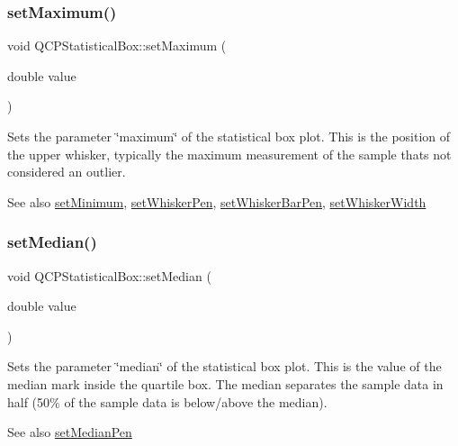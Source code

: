 \subsubsection{\texorpdfstring{set\+Maximum()}{setMaximum()}}
{\footnotesize\ttfamily void Q\+C\+P\+Statistical\+Box\+::set\+Maximum (\begin{DoxyParamCaption}\item[{double}]{value }\end{DoxyParamCaption})}

Sets the parameter \char`\"{}maximum\char`\"{} of the statistical box plot. This is the position of the upper whisker, typically the maximum measurement of the sample that\textquotesingle{}s not considered an outlier.

\begin{DoxySeeAlso}{See also}
\mbox{\hyperlink{class_q_c_p_statistical_box_a84ff7cc61ba44890f0c3e0c99c19941e}{set\+Minimum}}, \mbox{\hyperlink{class_q_c_p_statistical_box_a4a5034cb3b9b040444df05ab1684620b}{set\+Whisker\+Pen}}, \mbox{\hyperlink{class_q_c_p_statistical_box_aa8d3e503897788e1abf68dc74b5f147f}{set\+Whisker\+Bar\+Pen}}, \mbox{\hyperlink{class_q_c_p_statistical_box_adf378812446bd66f34d1f7f293d991cd}{set\+Whisker\+Width}} 
\end{DoxySeeAlso}
\mbox{\label{class_q_c_p_statistical_box_a65970e77a897da4ecb4b15300868aad3}} 
\subsubsection{\texorpdfstring{set\+Median()}{setMedian()}}
{\footnotesize\ttfamily void Q\+C\+P\+Statistical\+Box\+::set\+Median (\begin{DoxyParamCaption}\item[{double}]{value }\end{DoxyParamCaption})}

Sets the parameter \char`\"{}median\char`\"{} of the statistical box plot. This is the value of the median mark inside the quartile box. The median separates the sample data in half (50\% of the sample data is below/above the median).

\begin{DoxySeeAlso}{See also}
\mbox{\hyperlink{class_q_c_p_statistical_box_a7260ac55b669f5d0a74f16d5ca84c52c}{set\+Median\+Pen}} 
\end{DoxySeeAlso}
\mbox{\label{class_q_c_p_statistical_box_a7260ac55b669f5d0a74f16d5ca84c52c}} 
